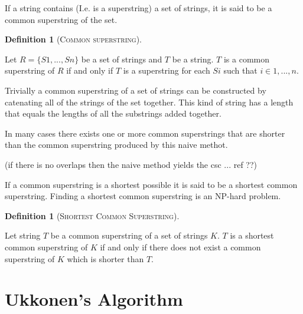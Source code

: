 \documentclass[english,twoside,censored,csm,algorithms-track-2020]{HYthesisML}
\theoremstyle{plain}
\theoremstyle{definition}
\newtheorem{definition}[theorem]{Definition}
\begin{document}
If a string contains (I.e. is a superstring) a set of strings, it is said to be a common superstring of the set.

\begin{definition}[\textsc{Common superstring}]~\label{def-cs}

  Let $R = \{S1,...,Sn\}$ be a set of strings and $T$ be a string.
  $T$ is a common superstring of $R$ if and only if $T$ is a superstring for each $Si$ such that $i\in 1,...,n$.
  
\end{definition}

Trivially a common superstring of a set of strings can be constructed by catenating all of the strings of the set together.
This kind of string has a length that equals the lengths of all the substrings added together.

In many cases there exists one or more common superstrings that are shorter than the common superstring produced by this naive methot.

(if there is no overlaps then the naive method yields the csc ... ref ??)

If a common superstring is a shortest possible it is said to be a shortest common superstring. Finding a shortest common superstring is
an \textsc{NP}-hard problem. 

\begin{definition}[\textsc{Shortest Common Superstring}]~\label{def-scs}

  Let string $T$ be a common superstring of a set of strings $K$.
  $T$ is a shortest common superstring of $K$ if and only if there does not exist a common superstring of $K$ which is shorter than $T$.
  
\end{definition}







\chapter{Ukkonen's Algorithm}~\label{chp-ukkonen}
\end{document}
